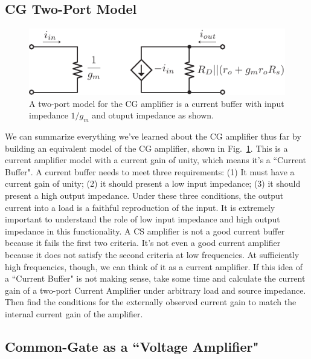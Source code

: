 \subsection{CG Two-Port Model}

\begin{figure}[tb]
\begin{center}
\includegraphics[scale=.9]{cg_model}
\end{center}
\caption{A two-port model for the CG amplifier is a current buffer with input impedance $1/g_m$ and otuput impedance as shown.  } \label{fig:cg_model}
\end{figure}

We can summarize everything we've learned about the CG amplifier thus far by building an equivalent model of the CG amplifier, shown in Fig.~\ref{fig:cg_model}.  This is a current amplifier model with a current gain of unity, which means it's a ``Current Buffer".  A current buffer needs to meet three requirements:  (1) It must have a current gain of unity; (2) it should present a low input impedance;  (3) it should present a high output impedance.  Under these three conditions, the output current into a load is a faithful reproduction of the input.  It is extremely important to understand the role of low input impedance and high output impedance in this functionality.  A CS amplifier is not a good current buffer because it fails the first two criteria.  It's not even a good current amplifier because it does not satisfy the second criteria at low frequencies.  At sufficiently high frequencies, though, we can think of it as a current amplifier.   If this idea of a ``Current Buffer" is not making sense, take some time and calculate the current gain of a two-port Current Amplifier under arbitrary load and source impedance.  Then find the conditions for the externally observed current gain to match the internal current gain of the amplifier.



\subsection{Common-Gate as a ``Voltage Amplifier"}

